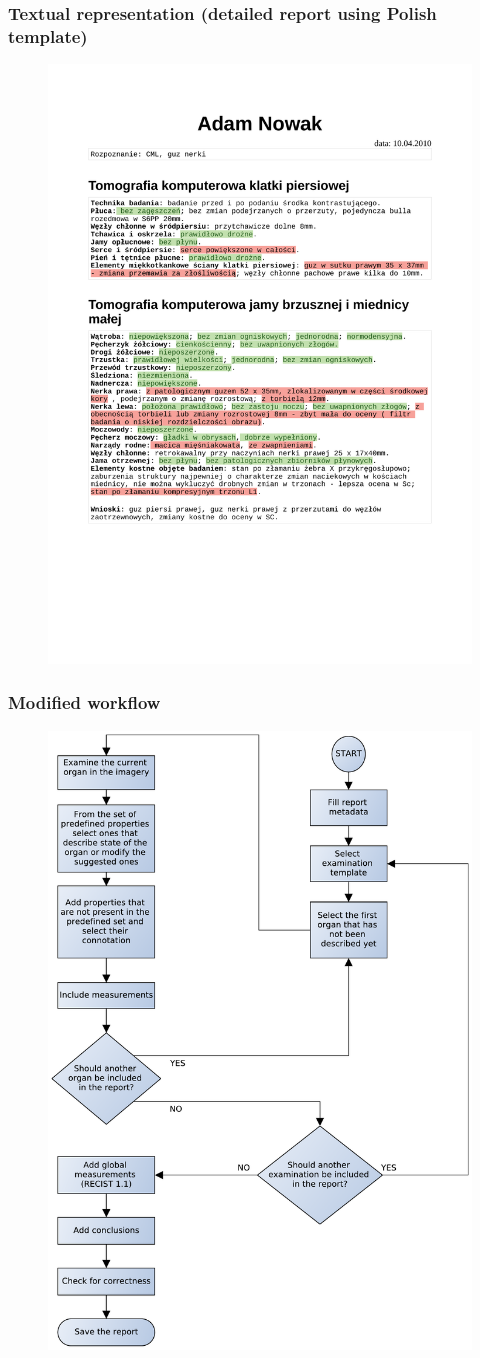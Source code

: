 \documentclass{beamer}
\begin{document}
\begin{frame}
\frametitle{Textual representation (detailed report using Polish template)}
\begin{figure}
	\centering
	\includegraphics[width=0.68\linewidth]{../rendered-report-pl-bad}
	\label{fig:rendered-report}
\end{figure}
\end{frame}

\begin{frame}
\frametitle{Modified workflow}
\begin{figure}
	\centering
	\includegraphics[width=0.5\linewidth]{../report-workflow}
	\label{fig:report-workflow}
\end{figure}
\end{frame}
\end{document}
